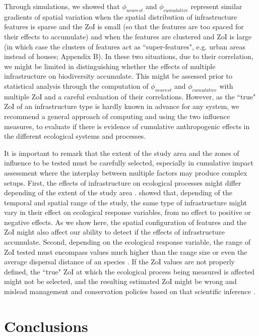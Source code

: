 \documentclass[titlepage]{article}
\begin{document}
{Through simulations, we showed that $\phi_{nearest}$ and $\phi_{cumulative}$ represent similar gradients of spatial variation when the spatial distribution of infrastructure features is sparse and the ZoI is small (so that the features are too spaced for their effects to accumulate) and when the features are clustered and ZoI is large (in which case the clusters of features act as ``super-features", e.g. urban areas instead of houses; Appendix B). In these two situations, due to their correlation, we might be limited in distinguishing whether the effects of multiple infrastructure on biodiversity accumulate. This might be assessed prior to statistical analysis through the computation of $\phi_{nearest}$ and $\phi_{cumulative}$ with multiple ZoI and a careful evaluation of their correlations. However, as the ``true" ZoI of an infrastructure type is hardly known in advance for any system, we recommend a general approach of computing and using the two influence measures, to evaluate if there is evidence of cumulative anthropogenic effects in the different ecological systems and processes.

It is important to remark that the extent of the study area and the zones of influence to be tested must be carefully selected, especially in cumulative impact assessment where the interplay between multiple factors may produce complex setups. First, the effects of infrastructure on ecological processes might differ depending of the extent of the study area \citep{vistnes_matter_2008}. \citet{skarin_human_2014} showed that, depending of the temporal and spatial range of the study, the same type of infrastructure might vary in their effect on ecological response variables, from no effect to positive or negative effects. As we show here, the spatial configuration of features and the ZoI might also affect our ability to detect if the effects of infrastructure accumulate. 
Second, depending on the ecological response variable, the range of ZoI tested must encompass values much higher than the range size or even the average dispersal distance of an species \citep{jackson_what_2012}. If the ZoI values are not properly defined, the ``true" ZoI at which the ecological process being measured is affected might not be selected, and the resulting estimated ZoI might be wrong and mislead management and conservation policies based on that scientific inference \citep[e.g.][]{jackson_are_2015}.

\section{Conclusions}

}
\end{document}
